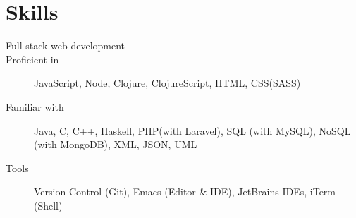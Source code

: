 \section*{Skills}
\begin{description}
  \item[Full-stack web development]
  \item[Proficient in] JavaScript, Node, Clojure, ClojureScript, HTML, CSS(SASS)
  \item[Familiar with] Java, C, C++, Haskell, PHP(with Laravel), SQL (with MySQL), NoSQL (with MongoDB), XML, JSON, UML
  \item[Tools] Version Control (Git), Emacs (Editor \& IDE), JetBrains IDEs, iTerm (Shell)
\end{description}
